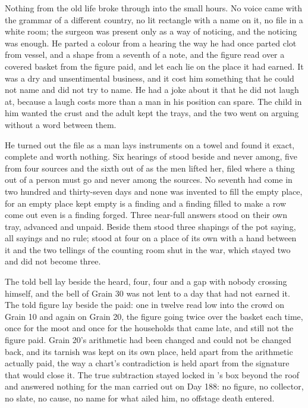 \scenebreak

Nothing from the old life broke through into the small hours. No voice came with the grammar of a different country, no lit rectangle with a name on it, no file in a white room; the surgeon was present only as a way of noticing, and the noticing was enough. He parted a colour from a hearing the way he had once parted clot from vessel, and a shape from a seventh of a note, and the figure read over a covered basket from the figure paid, and let each lie on the place it had earned. It was a dry and unsentimental business, and it cost him something that he could not name and did not try to name. He had a joke about it that he did not laugh at, because a laugh costs more than a man in his position can spare. The child in him wanted the crust and the adult kept the trays, and the two went on arguing without a word between them.

He turned out the file as a man lays instruments on a towel and found it exact, complete and worth nothing. Six hearings of  stood beside and never among, five from four sources and the sixth out of  as the men lifted her, filed where a thing out of a person must go and never among the sources. No seventh had come in two hundred and thirty-seven days and none was invented to fill the empty place, for an empty place kept empty is a finding and a finding filled to make a row come out even is a finding forged. Three near-full answers stood on their own tray, advanced and unpaid. Beside them stood three shapings of the pot saying, all sayings and no rule;  stood at four on a place of its own with a hand between it and the two tellings of the counting room shut in the war, which stayed two and did not become three.

The told bell lay beside the heard, four, four and a gap with nobody crossing himself, and the bell of Grain 30 was not lent to a day that had not earned it. The told figure lay beside the paid: one in twelve read low into the crowd on Grain 10 and again on Grain 20, the figure going twice over the basket each time, once for the moot and once for the households that came late, and still not the figure paid. Grain 20's arithmetic had been changed and could not be changed back, and its tarnish was kept on its own place, held apart from the arithmetic actually paid, the way a chart's contradiction is held apart from the signature that would close it. The true subtraction stayed locked in 's box beyond the roof and answered nothing for the man carried out on Day 188: no figure, no collector, no slate, no cause, no name for what ailed him, no offstage death entered.

